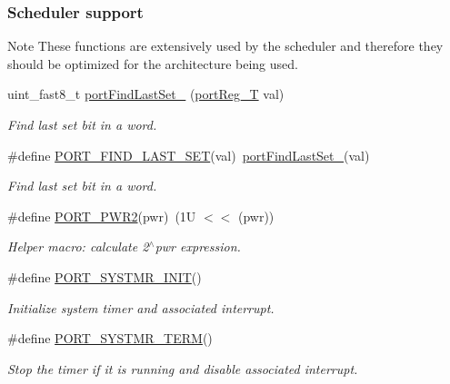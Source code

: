 \subsubsection*{Scheduler support}
\label{_amgrp4dcdbeafb69eec06b5ccc9a6733244b8}%
\begin{DoxyNote}{Note}
These functions are extensively used by the scheduler and therefore they should be optimized for the architecture being used. 
\end{DoxyNote}
\begin{DoxyCompactItemize}
\item 
uint\-\_\-fast8\-\_\-t \hyperlink{group__template__cpu__intf_ga548cbf806bfd34904f60a1f8db0ce965}{port\-Find\-Last\-Set\-\_\-} (\hyperlink{group__template__cpu__intf_ga99980ab56ce9857e7380210d12e3d41f}{port\-Reg\-\_\-\-T} val)
\begin{DoxyCompactList}\small\item\em Find last set bit in a word. \end{DoxyCompactList}\item 
\#define \hyperlink{group__template__cpu__intf_ga5574dfe2108fc8a4cf83647113724052}{P\-O\-R\-T\-\_\-\-F\-I\-N\-D\-\_\-\-L\-A\-S\-T\-\_\-\-S\-E\-T}(val)~\hyperlink{group__template__cpu__impl_ga548cbf806bfd34904f60a1f8db0ce965}{port\-Find\-Last\-Set\-\_\-}(val)
\begin{DoxyCompactList}\small\item\em Find last set bit in a word. \end{DoxyCompactList}\item 
\#define \hyperlink{group__template__cpu__intf_ga4b938b55e8398b93969cfb7bc64177cd}{P\-O\-R\-T\-\_\-\-P\-W\-R2}(pwr)~(1\-U $<$$<$ (pwr))
\begin{DoxyCompactList}\small\item\em Helper macro\-: calculate 2$^\wedge$pwr expression. \end{DoxyCompactList}\item 
\#define \hyperlink{group__template__cpu__intf_gae4de1f7cd0b489825c5f3d848211fa01}{P\-O\-R\-T\-\_\-\-S\-Y\-S\-T\-M\-R\-\_\-\-I\-N\-I\-T}()
\begin{DoxyCompactList}\small\item\em Initialize system timer and associated interrupt. \end{DoxyCompactList}\item 
\#define \hyperlink{group__template__cpu__intf_ga9da245ecf0f472f0e749fb360d1dd056}{P\-O\-R\-T\-\_\-\-S\-Y\-S\-T\-M\-R\-\_\-\-T\-E\-R\-M}()
\begin{DoxyCompactList}\small\item\em Stop the timer if it is running and disable associated interrupt. \end{DoxyCompactList}\item 
$$
\end{DoxyCompactItemize}
